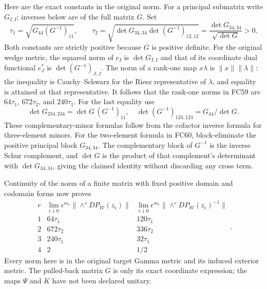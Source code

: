 \documentclass[11pt]{article}
\begin{document}
Here are the exact constants in the original norm. For a principal
submatrix write $G_{I,I}$; inverses below are of the full matrix $G$.
Set
\[
 \tau_1=\sqrt{G_{44}(G^{-1})_{11}},\qquad
 \tau_2=\sqrt{\det G_{34,34}\det(G^{-1})_{12,12}}
       =\frac{\det G_{34,34}}{\sqrt{\det G}}>0.
 \tag{FC60}
\]
Both constants are strictly positive because $G$ is positive definite.
For the original wedge metric, the squared norm of $e_I$ is
$\det G_{I,I}$ and that of its coordinate dual functional $e_J^*$ is
$\det(G^{-1})_{J,J}$. The norm of a rank-one map $x\lambda$ is
$\|x\|\|\lambda\|$: the inequality is Cauchy--Schwarz for the
Riesz representative of $\lambda$, and equality is attained at that
representative. It follows that the rank-one norms in FC59 are
$64\tau_1$, $672\tau_2$, and $240\tau_1$.
For the last equality use
\[
 \det G_{234,234}=\det G\,(G^{-1})_{11},\quad
 \det(G^{-1})_{123,123}=G_{44}/\det G.
\]
These complementary-minor formulas follow from the cofactor inverse
formula for three-element minors. For the two-element formula in
FC60, block-eliminate the positive principal block $G_{34,34}$.
The complementary block of $G^{-1}$ is the inverse Schur complement,
and $\det G$ is the product of that complement's determinant with
$\det G_{34,34}$, giving the claimed identity without discarding
any cross term.

Continuity of the norm of a finite matrix with fixed positive domain
and codomain forms now proves
\[
\begin{array}{c|c|c}
r&\displaystyle\lim_{\epsilon\downarrow0}\epsilon^{m_r}
 \|\wedge^r DP_{\mathcal W}(z_\epsilon)\|&
\displaystyle\lim_{\epsilon\downarrow0}\epsilon^{m_r}
 \|\wedge^r DP_{\mathcal W}(z_\epsilon)^{-1}\|\\\hline
1&64\tau_1&120\tau_1\\
2&672\tau_2&336\tau_2\\
3&240\tau_1&32\tau_1\\
4&2&1/2
\end{array}.
\tag{FC61}
\]
Every norm here is in the original target Gamma metric and its induced
exterior metric. The pulled-back matrix $G$ is only its exact coordinate
expression; the maps $\Psi$ and $K$ have not been declared unitary.
\end{document}

